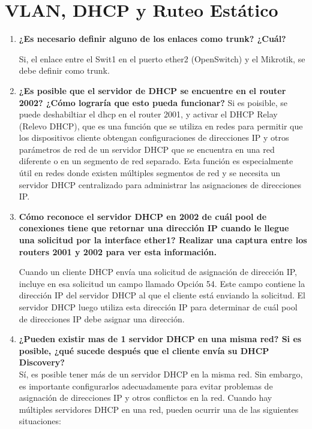 \documentclass[a4paper]{article}
\begin{document}
\section*{VLAN, DHCP y Ruteo Estático}
\begin{enumerate}
	\item \textbf{¿Es necesario definir alguno de los enlaces como trunk? ¿Cuál?
}

Si, el enlace entre el Swit1 en el puerto ether2 (OpenSwitch) y el Mikrotik, se debe definir como trunk.

\item \textbf{¿Es posible que el servidor de DHCP se encuentre en el router
2002? ¿Cómo lograría que esto pueda funcionar?
}
Si es poisible, se puede deshabiltiar el dhcp en el router 2001, y activar el DHCP Relay (Relevo DHCP), que  es una función que se utiliza en redes para permitir que los dispositivos cliente obtengan configuraciones de direcciones IP y otros parámetros de red de un servidor DHCP que se encuentra en una red diferente o en un segmento de red separado. Esta función es especialmente útil en redes donde existen múltiples segmentos de red y se necesita un servidor DHCP centralizado para administrar las asignaciones de direcciones IP.
	
\item \textbf{Cómo reconoce el servidor DHCP en 2002 de cuál pool de
		conexiones tiene que retornar una dirección IP cuando le llegue una solicitud por la interface ether1? Realizar una captura
		entre los routers 2001 y 2002 para ver esta información.
	}


Cuando un cliente DHCP envía una solicitud de asignación de dirección IP, incluye en esa solicitud un campo llamado Opción 54. Este campo contiene la dirección IP del servidor DHCP al que el cliente está enviando la solicitud. El servidor DHCP luego utiliza esta dirección IP para determinar de cuál pool de direcciones IP debe asignar una dirección.

\item \textbf{ ¿Pueden existir mas de 1 servidor DHCP en una misma red?
	Si es posible, ¿qué sucede después que el cliente envía su
	DHCP Discovery?}
	\\
	Sí, es posible tener más de un servidor DHCP en la misma red. Sin embargo, es importante configurarlos adecuadamente para evitar problemas de asignación de direcciones IP y otros conflictos en la red. Cuando hay múltiples servidores DHCP en una red, pueden ocurrir una de las siguientes situaciones:
	

\end{enumerate}
\end{document}
